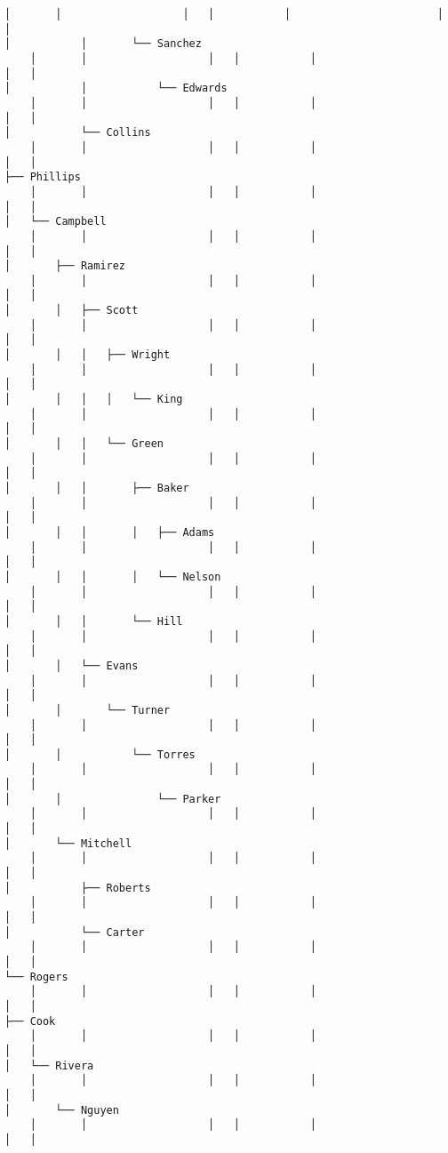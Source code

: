 \documentclass[11pt]{article}
\begin{document}
\begin{Verbatim}[commandchars=\\\{\}]
    │       │                   │   │           │                       │   │
│           │       └── Sanchez
    │       │                   │   │           │                       │   │
│           │           └── Edwards
    │       │                   │   │           │                       │   │
│           └── Collins
    │       │                   │   │           │                       │   │
├── Phillips
    │       │                   │   │           │                       │   │
│   └── Campbell
    │       │                   │   │           │                       │   │
│       ├── Ramirez
    │       │                   │   │           │                       │   │
│       │   ├── Scott
    │       │                   │   │           │                       │   │
│       │   │   ├── Wright
    │       │                   │   │           │                       │   │
│       │   │   │   └── King
    │       │                   │   │           │                       │   │
│       │   │   └── Green
    │       │                   │   │           │                       │   │
│       │   │       ├── Baker
    │       │                   │   │           │                       │   │
│       │   │       │   ├── Adams
    │       │                   │   │           │                       │   │
│       │   │       │   └── Nelson
    │       │                   │   │           │                       │   │
│       │   │       └── Hill
    │       │                   │   │           │                       │   │
│       │   └── Evans
    │       │                   │   │           │                       │   │
│       │       └── Turner
    │       │                   │   │           │                       │   │
│       │           └── Torres
    │       │                   │   │           │                       │   │
│       │               └── Parker
    │       │                   │   │           │                       │   │
│       └── Mitchell
    │       │                   │   │           │                       │   │
│           ├── Roberts
    │       │                   │   │           │                       │   │
│           └── Carter
    │       │                   │   │           │                       │   │
└── Rogers
    │       │                   │   │           │                       │   │
├── Cook
    │       │                   │   │           │                       │   │
│   └── Rivera
    │       │                   │   │           │                       │   │
│       └── Nguyen
    │       │                   │   │           │                       │   │

\end{Verbatim}
\end{document}
